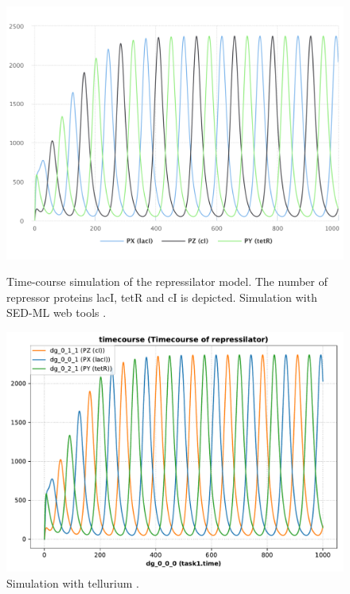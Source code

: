 \begin{figure}[ht]
    \centering
    \begin{minipage}{0.47\textwidth}
        \centering
        \includegraphics[width=1.0\textwidth]{examples/repressilator/results/sedml_webtools/timecourse}
        \caption{Time-course simulation of the repressilator model. The number of repressor proteins lacI, tetR and cI is depicted. Simulation with SED-ML web tools \citep{bergmann2017sed}.}
    \end{minipage}\hfill
    \begin{minipage}{0.45\textwidth}
        \centering
        \includegraphics[width=1.0\textwidth]{examples/repressilator/results/tellurium/timecourse}
        \caption{Simulation with tellurium \citep{tellurium}.}
    \end{minipage}
    \label{fig:rep_tc}
\end{figure}

